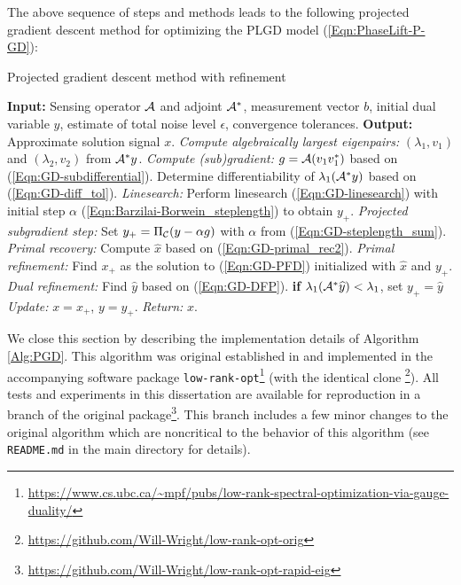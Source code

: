 The above sequence of steps and methods leads to the following projected gradient descent method for optimizing the PLGD model  (\ref{Eqn:PhaseLift-P-GD}):
\begin{algorithm}[H]
\caption{Projected gradient descent method with refinement} 	\label{Alg:PGD}

\begin{algorithmic}[1]
	\Statex 	\textbf{Input:} Sensing operator ${\mathcal A}$ and adjoint ${\mathcal A}^*$, measurement vector $b$,
	initial dual variable $y$, estimate of total noise level $\epsilon$,  convergence
	tolerances.
	\Statex 	\textbf{Output:} Approximate solution signal $x$.
		\State 		\textit{Compute algebraically largest eigenpairs:} $(\lambda_1, v_1)$ and  $(\lambda_2, v_2)$ from ${\mathcal A}^*y$.
		\State 		\textit{Compute (sub)gradient:} $g = {\mathcal A}(v_1 v_1^*)$ based on  (\ref{Eqn:GD-subdifferential}).
		\State		Determine differentiability of $\lambda_1({\mathcal A}^*y)$ based on (\ref{Eqn:GD-diff_tol}).
			\State		\textit{Linesearch:} Perform linesearch (\ref{Eqn:GD-linesearch}) with initial step $\alpha$ (\ref{Eqn:Barzilai-Borwein_steplength}) to obtain $y_+$.	
		\Else
			\State		\textit{Projected subgradient step:} Set $y_+ = \Pi_{\mathcal C} (y - \alpha g)$ with $\alpha$ from (\ref{Eqn:GD-steplength_sum}).
		\EndIf
		\State		\textit{Primal recovery:} Compute $\hat{x}$ based on (\ref{Eqn:GD-primal_rec2}).
		\State		\textit{Primal refinement:} Find $x_+$ as the solution to (\ref{Eqn:GD-PFD}) initialized with $\hat{x}$ and $y_+$.
		 {}
			\State		\textit{Dual refinement:} Find $\widehat{y}$ based on (\ref{Eqn:GD-DFP}).
			\State		\textbf{if} $\lambda_1({\mathcal A}^* \widehat{y}) < \lambda_1$, set $y_+ = \widehat{y}$
		\EndIf
			\State	\textit{Update:} $x = x_+$, $y = y_+$.
	\EndWhile
	\State	\textit{Return:} $x$. 
\end{algorithmic}

\end{algorithm}







We close this section by describing the implementation details of Algorithm \ref{Alg:PGD}.  This algorithm was original established in \cite{DBLP:journals/siamsc/FriedlanderM16} and implemented in the accompanying software package \texttt{low-rank-opt}\footnote{\url{https://www.cs.ubc.ca/~mpf/pubs/low-rank-spectral-optimization-via-gauge-duality/}} (with the identical clone \footnote{\url{https://github.com/Will-Wright/low-rank-opt-orig}}).  All tests and experiments in this dissertation are available for reproduction in a branch of the original package\footnote{\url{https://github.com/Will-Wright/low-rank-opt-rapid-eig}}.  This branch includes a few minor changes to the original algorithm which are noncritical to the behavior of this algorithm (see \texttt{README.md} in the main directory for details).


